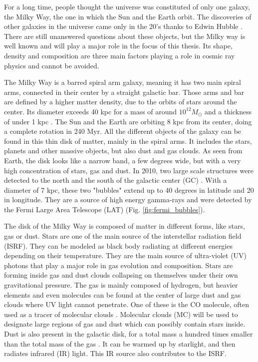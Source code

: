For a long time, people thought the universe was constituted of only one galaxy, the Milky Way, the one in which the Sun and the Earth orbit. The discoveries of other galaxies in the universe came only in the 20's thanks to Edwin Hubble \cite{Hubble1925}. There are still unanswered questions about these objects, but the Milky way is well known and will play a major role in the focus of this thesis. Its shape, density and composition are three main factors playing a role in cosmic ray physics and cannot be avoided.

The Milky Way is a barred spiral arm galaxy, meaning it has two main spiral arms, connected in their center by a straight galactic bar. Those arms and bar are defined by a higher matter density, due to the orbits of stars around the center. Its diameter exceeds 40 kpc for a mass of around $10^{12} M_\odot$ and a thickness of under 1 kpc \cite{Kafle2014}. The Sun and the Earth are orbiting 8 kpc from its center, doing a complete rotation in 240 Myr.
All the different objects of the galaxy can be found in this thin disk of matter, mainly in the spiral arms. It includes the stars, planets and other massive objects, but also dust and gas clouds. As seen from Earth, the disk looks like a narrow band, a few degrees wide, but with a very high concentration of stars, gas and dust.
In 2010, two large scale structures were detected to the north and the south of the galactic center (GC) \cite{Slatyer2010} \cite{Ackermann2014}. With a diameter of 7 kpc, these two "bubbles" extend up to 40 degrees in latitude and 20 in longitude. They are a source of high energy gamma-rays and were detected by the Fermi Large Area Telescope (LAT) (Fig. \ref{fig:fermi_bubbles}).

The disk of the Milky Way is composed of matter in different forms, like stars, gas or dust. Stars are one of the main source of the interstellar radiation field (ISRF). They can be modeled as black body radiating at different energies depending on their temperature. They are the main source of ultra-violet (UV) photons that play a major role in gas evolution and composition. Stars are forming inside gas and dust clouds collapsing on themselves under their own gravitational pressure.
The gas is mainly composed of hydrogen, but heavier elements and even molecules can be found at the center of large dust and gas clouds where UV light cannot penetrate. One of these is the CO molecule, often used as a tracer of molecular clouds \cite{Planck2014} \cite{Liu2013}. Molecular clouds (MC) will be used to designate large regions of gas and dust which can possibly contain stars inside.
Dust is also present in the galactic disk, for a total mass a hundred times smaller than the total mass of the gas \cite{Bohlin1978}. It can be warmed up by starlight, and then radiates infrared (IR) light. This IR source also contributes to the ISRF.


